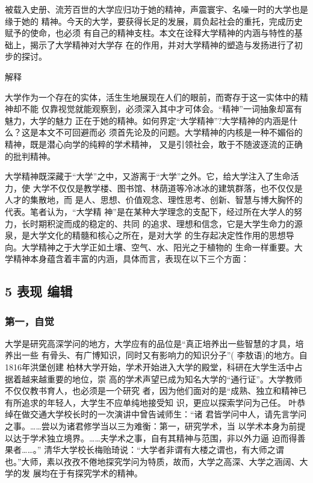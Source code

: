 \documentclass[11pt]{ctexart}
\begin{document}
{{{{被载入史册、流芳百世的大学应归功于她的精神，声震寰宇、名噪一时的大学也是缘于她的
精神。今天的大学，要获得长足的发展，肩负起社会的重托，完成历史赋予的使命，也必须
有自己的精神支柱。本文在诠释大学精神的内涵与特性的基础上，揭示了大学精神对大学存
在的作用，并对大学精神的塑造与发扬进行了初步的探讨。


解释

大学作为一个存在的实体，活生生地展现在人们的眼前，而寄存于这一实体中的精神却不能
仅靠视觉就能观察到，必须深入其中才可体会。“精神”一词抽象却富有魅力，大学的魅力
正在于她的精神。如何界定“大学精神”?大学精神的内涵是什么？这是本文不可回避而必
须首先论及的问题。大学精神的内核是一种不媚俗的精神，既是潜心向学的纯粹的学术精神，
又是引领社会，敢于不随波逐流的正确的批判精神。


大学精神既深藏于“大学”之中，又游离于“大学”之外。它，给大学注入了生命活力，使
大学不仅仅是教学楼、图书馆、林荫道等冷冰冰的建筑群落，也不仅仅是人才的集散地，而
是人、思想、价值观念、理性思考、创新、智慧与博大胸怀的代表。笔者认为，“大学精
神”是在某种大学理念的支配下，经过所在大学人的努力，长时期积淀而成的稳定的、共同
的追求、理想和信念，它是大学生命力的源泉，是大学文化的精髓和核心之所在，是对大学
的生存起决定性作用的思想导向。大学精神之于大学正如土壤、空气、水、阳光之于植物的
生命一样重要。大学精神本身蕴含着丰富的内涵，具体而言，表现在以下三个方面：


\subsection{5 表现 编辑}
\label{sec:orgfbce137}
\subsubsection{第一，自觉}
\label{sec:org7fac183}

大学是研究高深学问的地方，大学应有的品位是“真正培养出一些智慧的才具，培养出一些
有骨头、有广博知识，同时又有影响力的知识分子”( 李敖语)的地方。自1816年洪堡创建
柏林大学开始，学术开始进入大学的殿堂，科研在大学生活中占据着越来越重要的地位，崇
高的学术声望已成为知名大学的“通行证”。大学教师不仅仅教书育人，也必须是一个研究
者，因为他们面对的是“成熟、独立和精神已有所追求的年轻人，大学生不应单纯地接受知
识，更应以探索学问为己任。 叶恭绰在做交通大学校长时的一次演讲中曾告诫师生：“诸
君皆学问中人，请先言学问之事。……尝以为诸君修学当以三为难衡：第一，研究学术，当
以学术本身为前提以达于学术独立境界。……夫学术之事，自有其精神与范围，非以外力逼
迫而得善果者……。” 清华大学校长梅贻琦说：“大学者非谓有大楼之谓也，有大师之谓
也。”大师，素以孜孜不倦地探究学问为特质，故而，大学之高深、大学之涵阔、大学的发
展均在于有探究学术的精神。


}}}}
\end{document}
